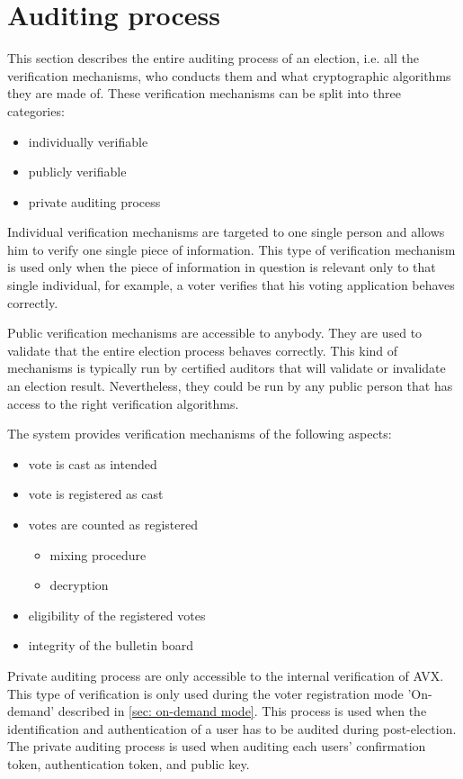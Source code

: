 \section{Auditing process} \label{sec: auditing process}
This section describes the entire auditing process of an election, i.e. all the verification mechanisms, who conducts them and what cryptographic algorithms they are made of. These verification mechanisms can be split into three categories:
\begin{itemize}
    \item individually verifiable
    \item publicly verifiable
    \item private auditing process
\end{itemize}

Individual verification mechanisms are targeted to one single person and allows him to verify one single piece of information. This type of verification mechanism is used only when the piece of information in question is relevant only to that single individual, for example, a voter verifies that his voting application behaves correctly. 

Public verification mechanisms are accessible to anybody. They are used to validate that the entire election process behaves correctly. This kind of mechanisms is typically run by certified auditors that will validate or invalidate an election result. Nevertheless, they could be run by any public person that has access to the right verification algorithms.

The system provides verification mechanisms of the following aspects:
\begin{itemize}
    \item vote is cast as intended
    \item vote is registered as cast
    \item votes are counted as registered
    \begin{itemize}
        \item mixing procedure
        \item decryption
    \end{itemize}
    \item eligibility of the registered votes
    \item integrity of the bulletin board
\end{itemize}

Private auditing process are only accessible to the internal verification of AVX. This type of verification is only used during the voter registration mode 'On-demand' described in \cref{sec: on-demand mode}. This process is used when the identification and authentication of a user has to be audited during post-election. The private auditing process is used when auditing each users' confirmation token, authentication token, and public key.
